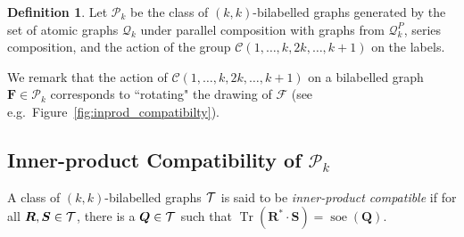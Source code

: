 \documentclass[11pt,a4paper]{article}
\theoremstyle{plain}
\theoremstyle{remark}
\theoremstyle{definition}
\newtheorem{definition}[thm]{Definition}
\DeclareMathOperator{\tr}{Tr}
\DeclareMathOperator{\soe}{soe}
\def\calP{{\mathcal P}} \def\calQ{{\mathcal Q}} \def\calR{{\mathcal R}}
\newcommand{\cyclicpermutations}{\mathscr{C}(1,\dots, k, 2k, \dots, k+1)}
\begin{document}
\begin{definition}\label{def:pk}
  Let $\mathcal{P}_k$ be the class of $(k, k)$-bilabelled graphs generated by the set of atomic graphs $\mathcal{Q}_k$ under parallel composition with graphs from $\mathcal{Q}_k^P$, series composition, and the action of the group $\cyclicpermutations$ on the labels.
\end{definition}

We remark that the action of $\cyclicpermutations$ on a bilabelled graph $\boldsymbol{F} \in \calP_k$ corresponds to ``rotating" the drawing of $\mathcal{F}$ (see e.g.~Figure~\ref{fig:inprod_compatibilty}). 


\subsection{Inner-product Compatibility of $\calP_k$}\label{sub-sec:inprodcomp}

A class of $(k,k)$-bilabelled graphs ${\mathcal T}$ is said to be \emph{inner-product compatible} if for all $\boldsymbol{R}, \boldsymbol{S} \in {\mathcal T}$, there is a $\boldsymbol{Q} \in {\mathcal T}$ such that $\tr(\boldsymbol{R}^*\cdot \boldsymbol{S}) = \soe(\boldsymbol{Q})$. 
\end{document}
